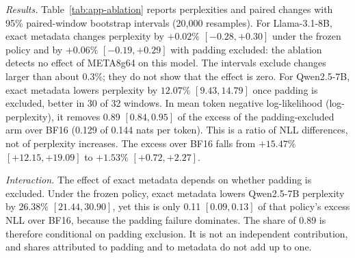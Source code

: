 \documentclass{article}
\begin{document}
\emph{Results.} Table~\ref{tab:app-ablation} reports perplexities and paired changes with 95\%
paired-window bootstrap intervals (20,000 resamples). For Llama-3.1-8B, exact metadata changes
perplexity by $+0.02\%$ $[-0.28, +0.30]$ under the frozen policy and by $+0.06\%$ $[-0.19, +0.29]$ with
padding excluded: the ablation detects no effect of META8g64 on this model. The intervals exclude
changes larger than about 0.3\%; they do not show that the effect is zero. For Qwen2.5-7B, exact
metadata lowers perplexity by $12.07\%$ $[9.43, 14.79]$ once padding is excluded, better in 30 of 32
windows. In mean token negative log-likelihood (log-perplexity), it removes 0.89 $[0.84, 0.95]$ of the
excess of the padding-excluded arm over BF16 (0.129 of 0.144 nats per token). This is a ratio of NLL
differences, not of perplexity increases. The excess over BF16 falls from $+15.47\%$ $[+12.15, +19.09]$
to $+1.53\%$ $[+0.72, +2.27]$.

\emph{Interaction.} The effect of exact metadata depends on whether padding is excluded. Under the
frozen policy, exact metadata lowers Qwen2.5-7B perplexity by $26.38\%$ $[21.44, 30.90]$, yet this is
only 0.11 $[0.09, 0.13]$ of that policy's excess NLL over BF16, because the padding failure dominates.
The share of 0.89 is therefore conditional on padding exclusion. It is not an independent contribution,
and shares attributed to padding and to metadata do not add up to one.
\end{document}
